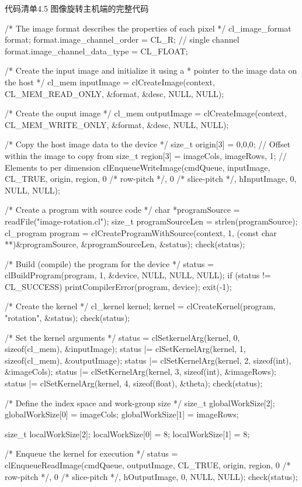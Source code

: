 \begin{codeboxt}[cpp]{代码清单4.5 图像旋转主机端的完整代码}
{  /* The image format describes the properties of each pixel */
  cl_image_format format;
  format.image_channel_order = CL_R; // single channel
  format.image_channel_data_type = CL_FLOAT;

  /* Create the input image and initialize it using a
   * pointer to the image data on the host */
  cl_mem inputImage = clCreateImage(context, CL_MEM_READ_ONLY, &format, &desc, NULL, NULL);

  /* Create the ouput image */
  cl_mem outputImage = clCreateImage(context, CL_MEM_WRITE_ONLY, &format, &desc, NULL, NULL);

  /* Copy the host image data to the device */
  size_t origin[3] = {0,0,0}; // Offset within the image to copy from
  size_t region[3] = {imageCols, imageRows, 1}; // Elements to per dimension
  clEnqueueWriteImage(cmdQueue, inputImage, CL_TRUE,
    origin, region, 0 /* row-pitch */, 0 /* slice-pitch */, hInputImage, 0, NULL, NULL);

  /* Create a program with source code */
  char *programSource = readFile("image-rotation.cl");
  size_t programSourceLen = strlen(programSource);
  cl_program program = clCreateProgramWithSource(context, 1, (const char **)&programSource, &programSourceLen, &status);
  check(status);

  /* Build (compile) the program for the device */
  status = clBuildProgram(program, 1, &device, NULL, NULL, NULL);
  if (status != CL_SUCCESS){
    printCompilerError(program, device);
    exit(-1);
  }

  /* Create the kernel */
  cl_kernel kernel;
  kernel = clCreateKernel(program, "rotation", &status);
  check(status);

  /* Set the kernel arguments */
  status = clSetkernelArg(kernel, 0, sizeof(cl_mem), &inputImage);
  status |= clSetKernelArg(kernel, 1, sizeof(cl_mem), &outputImage);
  status |= clSetKernelArg(kernel, 2, sizeof(int), &imageCols);
  status |= clSetKernelArg(kernel, 3, sizeof(int), &imageRows);
  status |= clSetKernelArg(kernel, 4, sizeof(float), &theta);
  check(status);

  /* Define the index space and work-group size */
  size_t globalWorkSize[2];
  globalWorkSize[0] = imageCols;
  globalWorkSize[1] = imageRows;

  size_t localWorkSize[2];
  localWorkSize[0] = 8;
  localWorkSize[1] = 8;

  /* Enqueue the kernel for execution */
  status = clEnqueueReadImage(cmdQueue, outputImage, CL_TRUE, origin, region, 0 /* row-pitch */, 0 /* slice-pitch */, hOutputImage, 0, NULL, NULL);
  check(status);

}
\end{codeboxt}
